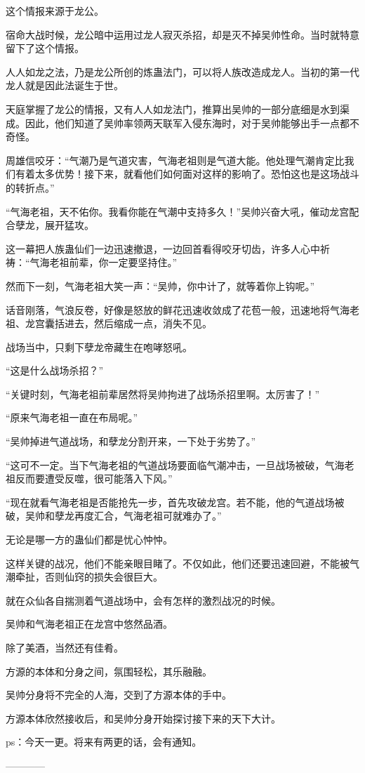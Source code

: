 \begin{this_body}
这个情报来源于龙公。

宿命大战时候，龙公暗中运用过龙人寂灭杀招，却是灭不掉吴帅性命。当时就特意留下了这个情报。

人人如龙之法，乃是龙公所创的炼蛊法门，可以将人族改造成龙人。当初的第一代龙人就是因此法诞生于世。

天庭掌握了龙公的情报，又有人人如龙法门，推算出吴帅的一部分底细是水到渠成。因此，他们知道了吴帅率领两天联军入侵东海时，对于吴帅能够出手一点都不奇怪。

周雄信咬牙：“气潮乃是气道灾害，气海老祖则是气道大能。他处理气潮肯定比我们有着太多优势！接下来，就看他们如何面对这样的影响了。恐怕这也是这场战斗的转折点。”

“气海老祖，天不佑你。我看你能在气潮中支持多久！”吴帅兴奋大吼，催动龙宫配合孽龙，展开猛攻。

这一幕把人族蛊仙们一边迅速撤退，一边回首看得咬牙切齿，许多人心中祈祷：“气海老祖前辈，你一定要坚持住。”

然而下一刻，气海老祖大笑一声：“吴帅，你中计了，就等着你上钩呢。”

话音刚落，气浪反卷，好像是怒放的鲜花迅速收敛成了花苞一般，迅速地将气海老祖、龙宫囊括进去，然后缩成一点，消失不见。

战场当中，只剩下孽龙帝藏生在咆哮怒吼。

“这是什么战场杀招？”

“关键时刻，气海老祖前辈居然将吴帅拘进了战场杀招里啊。太厉害了！”

“原来气海老祖一直在布局呢。”

“吴帅掉进气道战场，和孽龙分割开来，一下处于劣势了。”

“这可不一定。当下气海老祖的气道战场要面临气潮冲击，一旦战场被破，气海老祖反而要遭受反噬，很可能落入下风。”

“现在就看气海老祖是否能抢先一步，首先攻破龙宫。若不能，他的气道战场被破，吴帅和孽龙再度汇合，气海老祖可就难办了。”

无论是哪一方的蛊仙们都是忧心忡忡。

这样关键的战况，他们不能亲眼目睹了。不仅如此，他们还要迅速回避，不能被气潮牵扯，否则仙窍的损失会很巨大。

就在众仙各自揣测着气道战场中，会有怎样的激烈战况的时候。

吴帅和气海老祖正在龙宫中悠然品酒。

除了美酒，当然还有佳肴。

方源的本体和分身之间，氛围轻松，其乐融融。

吴帅分身将不完全的人海，交到了方源本体的手中。

方源本体欣然接收后，和吴帅分身开始探讨接下来的天下大计。

ps：今天一更。将来有两更的话，会有通知。

------------

\end{this_body}

